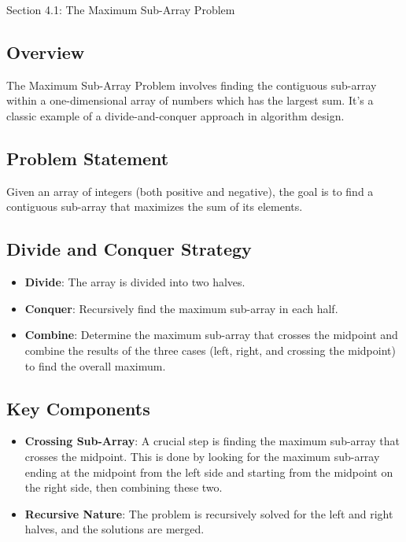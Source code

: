 \begin{notes}{Section 4.1: The Maximum Sub-Array Problem}
    \subsection*{Overview}

    The Maximum Sub-Array Problem involves finding the contiguous sub-array within a one-dimensional array of numbers which has the largest sum. It's a classic example of a divide-and-conquer approach 
    in algorithm design. \vspace*{1em}

    \subsection*{Problem Statement}

    Given an array of integers (both positive and negative), the goal is to find a contiguous sub-array that maximizes the sum of its elements. \vspace*{1em}

    \subsection*{Divide and Conquer Strategy}

    \begin{itemize}
        \item \textbf{Divide}: The array is divided into two halves.
        \item \textbf{Conquer}: Recursively find the maximum sub-array in each half.
        \item \textbf{Combine}: Determine the maximum sub-array that crosses the midpoint and combine the results of the three cases (left, right, and crossing the midpoint) to find the overall maximum.
    \end{itemize}

    \subsection*{Key Components}

    \begin{itemize}
        \item \textbf{Crossing Sub-Array}: A crucial step is finding the maximum sub-array that crosses the midpoint. This is done by looking for the maximum sub-array ending at the midpoint from the 
        left side and starting from the midpoint on the right side, then combining these two.
        \item \textbf{Recursive Nature}: The problem is recursively solved for the left and right halves, and the solutions are merged.
    \end{itemize}


\end{notes}
